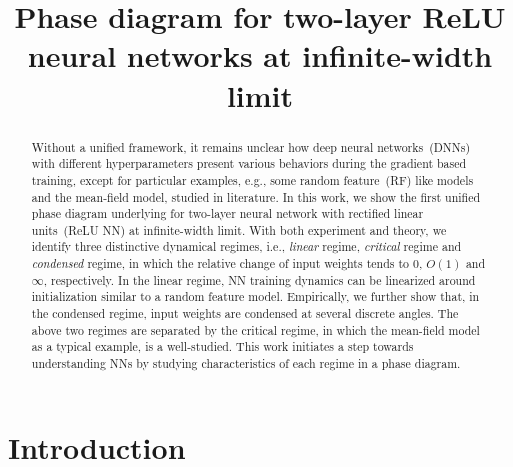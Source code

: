 \documentclass{article}
\begin{document}
\title{Phase diagram for two-layer ReLU neural networks at infinite-width limit}
\author{}

\maketitle
\begin{abstract}
    Without a unified framework, it remains unclear how deep neural networks~(DNNs) with different hyperparameters present various behaviors during the gradient based training,  except for particular examples, e.g., some random feature~(RF) like models and the mean-field model, studied in literature. In this work, we show the first unified phase diagram underlying for two-layer neural network with rectified linear units~(ReLU NN) at infinite-width limit. With both experiment and theory, we identify three distinctive dynamical regimes, i.e., \emph{linear} regime, \emph{critical} regime and \emph{condensed} regime, in which the relative change of input weights tends to $0$, $O(1)$ and $\infty$, respectively. In the linear regime, NN training dynamics can be linearized around initialization similar to a random feature model. Empirically, we further show that, in the condensed regime, input weights are condensed at several discrete angles. The above two regimes are separated by the critical regime, in which the mean-field model as a typical example, is a well-studied. This work initiates a step towards understanding NNs by studying characteristics of each regime in a phase diagram.
\end{abstract}

\section{Introduction}
\end{document}
